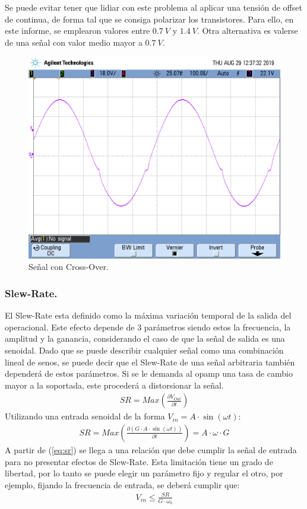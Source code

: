 Se puede evitar tener que lidiar con este problema al aplicar una tensión de offset de continua, de forma tal que se consiga polarizar los transistores. Para ello, en este informe, se emplearon valores entre $0.7 \ V$ y $1.4 \ V$. Otra alternativa es valerse de una señal con valor medio mayor a $0.7 \ V$. 
\begin{figure}[H]	
	\centering
	\includegraphics[width=\textwidth]{Ejercicio1/Imagenes/CrossOver.png}
	\caption{Señal con Cross-Over.}
	\label{fig:co}
\end{figure} 

\subsubsection{Slew-Rate.}
El Slew-Rate esta definido como la máxima variación temporal de la salida del operacional. Este efecto depende de 3 parámetros siendo estos la frecuencia, la amplitud y la ganancia, considerando el caso de que la señal de salida es una senoidal. Dado que se puede describir cualquier señal como una combinación lineal de senos, se puede decir que el Slew-Rate de una señal arbitraria también dependerá de estos parámetros.
Si se le demanda al opamp una tasa de cambio mayor a la soportada, este procederá a distorsionar la señal.
\begin{align}  SR= Max\left( \frac{\partial V_{Out}}{\partial t}\right)  \end{align}
Utilizando una entrada senoidal de la forma $V_{in}=A\cdot \sin (\omega t)$:
\begin{align}   SR= Max\left( \frac{\partial (G\cdot A\cdot \sin (\omega t))}{\partial t}\right) = A \cdot \omega \cdot G  
\label{eq:sr}
\end{align}
A partir de (\ref{eq:sr}) se llega a una relación que debe cumplir la señal de entrada para no presentar efectos de Slew-Rate. Esta limitación tiene un grado de libertad, por lo tanto se puede elegir un parámetro fijo y regular el otro, por ejemplo, fijando la frecuencia de entrada, se deberá cumplir que:
\begin{align} V_{in}	\leq \frac{SR}{G\cdot \omega_0}\end{align}

